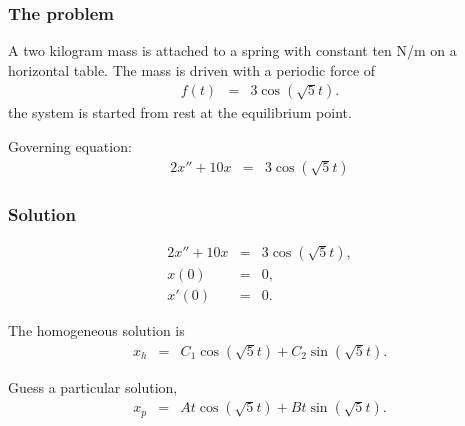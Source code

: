 \begin{frame}
  \frametitle{The problem}

  A two kilogram mass is attached to a spring with constant ten N/m on
  a horizontal table. The mass is driven with a periodic force of
  \begin{eqnarray*}
    f(t) & = & 3 \cos(\sqrt{5} t).
  \end{eqnarray*}
  the system is started from rest at the equilibrium point.

  Governing equation:
  \begin{eqnarray*}
    2 x'' + 10 x & = & 3 \cos(\sqrt{5} t)
  \end{eqnarray*}

\end{frame}


\begin{frame}
  \frametitle{Solution}

  \begin{eqnarray*}
    2 x'' + 10 x & = & 3 \cos(\sqrt{5} t), \\
    x(0) & = & 0, \\
    x'(0) & = & 0.
  \end{eqnarray*}

  The homogeneous solution is
  \begin{eqnarray*}
    x_h & = & C_1 \cos(\sqrt{5} t) + C_2 \sin(\sqrt{5} t).
  \end{eqnarray*}

  {
    Guess a particular solution,
    \begin{eqnarray*}
      x_p & = & A t \cos(\sqrt{5} t) + B t \sin(\sqrt{5} t).
    \end{eqnarray*}
  }

\end{frame}

